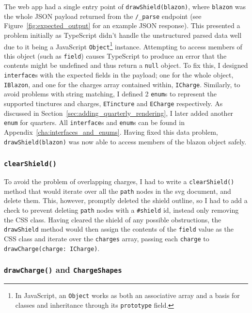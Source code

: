 \documentclass[nobib, a4paper, twoside, justified]{tufte-book}
\makeatletter
\newcommand{\svg}{\gls{svg}\@\xspace}
\newcommand{\charge}{\gls{charge}\@\xspace}
\newcommand{\charges}{\glspl{charge}\@\xspace}
\newcommand{\blazon}{\gls{blazon}\@\xspace}
\newcommand{\payload}{\gls{payload}\@\xspace}
\makeatother
\begin{document}
The web app had a single entry point of \texttt{drawShield(\blazon)}, where \texttt{\blazon} was
the whole JSON \payload returned from the \texttt{/\_parse} endpoint (see
Figure~\ref{fig:expected_output} for an example JSON response). This presented a problem initially
as TypeScript didn't handle the unstructured parsed data well due to it being a JavaScript
\texttt{Object}\footnote{In JavaScript, an \texttt{Object} works as both an associative array and a
basis for classes and inheritance through its \texttt{prototype} field.} instance. Attempting to
access members of this object (such as \texttt{\gls{field}}) causes TypeScript to produce an error
that the contents might be undefined and thus return a \texttt{null} object. To fix this, I
designed \texttt{interface}s with the expected fields in the \payload; one for the whole object,
\texttt{IBlazon}, and one for the \charges array contained within, \texttt{ICharge}. Similarly, to
avoid problems with string matching, I defined 2 \texttt{enum}s to represent the supported
tinctures and \charges, \texttt{ETincture} and \texttt{ECharge} respectively. As discussed in
Section~\ref{sec:adding_quarterly_rendering}, I later added another \texttt{enum} for quarters.
All \texttt{interface}s and \texttt{enum}s can be found in Appendix~\ref{cha:interfaces_and_enums}.
Having fixed this data problem, \texttt{drawShield(\blazon)} was now able to access members of the
\blazon object safely.

\subsubsection{\texttt{clearShield()}}%
\label{ssub:clear_shield}

To avoid the problem of overlapping \charges, I had to write a \texttt{clearShield()} method that
would iterate over all the \texttt{path} nodes in the \svg document, and delete them. This,
however, promptly deleted the shield outline, so I had to add a check to prevent deleting
\texttt{path} nodes with a \texttt{\#shield} id, instead only removing the CSS class. Having
cleared the shield of any possible obstructions, the \texttt{drawShield} method would then assign
the contents of the \texttt{field} value as the CSS class and iterate over the \texttt{\charges}
array, passing each \texttt{\charge} to \texttt{drawCharge(charge: ICharge)}.

\subsubsection{\texttt{drawCharge()} and \texttt{ChargeShapes}}%
\label{ssub:draw_charge}
\end{document}

